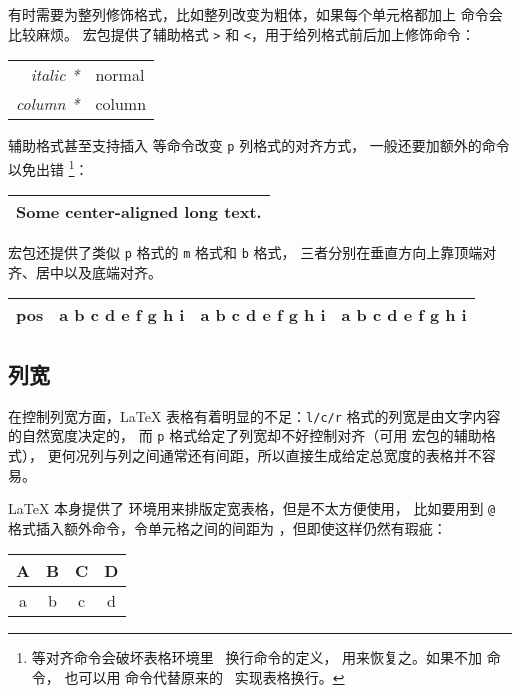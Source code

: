 有时需要为整列修饰格式，比如整列改变为粗体，如果每个单元格都加上  命令会比较麻烦。
 宏包提供了辅助格式 \texttt> 和 \texttt<，用于给列格式前后加上修饰命令：
\begin{example}
\begin{tabular}{>{\itshape}r<{*}l}
  \hline
  italic & normal \\
  column & column \\
  \hline
\end{tabular}
\end{example}

辅助格式甚至支持插入  等命令改变 \texttt{p} 列格式的对齐方式，
一般还要加额外的命令  以免出错%
\footnote{ 等对齐命令会破坏表格环境里 \crcmd\ 换行命令的定义，
 用来恢复之。如果不加  命令，
也可以用  命令代替原来的 \crcmd\ 实现表格换行。}：
\begin{example}
\begin{tabular}
{>{\centering\arraybackslash}p{9em}}
  \hline
  Some center-aligned long text. \\
  \hline
\end{tabular}
\end{example}

 宏包还提供了类似 \texttt{p} 格式的 \texttt{m} 格式和 \texttt{b} 格式，
三者分别在垂直方向上靠顶端对齐、居中以及底端对齐。
\begin{example}
\newcommand\txt
  {a b c d e f g h i}
\begin{tabular}{cp{2em}m{2em}b{2em}}
  \hline
  pos & \txt & \txt & \txt \\
  \hline
\end{tabular}
\end{example}

\subsection{列宽}\label{subsec:colwidth}

在控制列宽方面，\LaTeX{} 表格有着明显的不足：\texttt{l/c/r} 格式的列宽是由文字内容的自然宽度决定的，
而 \texttt{p} 格式给定了列宽却不好控制对齐（可用  宏包的辅助格式），
更何况列与列之间通常还有间距，所以直接生成给定总宽度的表格并不容易。

\LaTeX{} 本身提供了  环境用来排版定宽表格，但是不太方便使用，
比如要用到 \texttt{@} 格式插入额外命令，令单元格之间的间距为 ，但即使这样仍然有瑕疵：
\begin{example}
\begin{tabular*}{14em}%
{@{\extracolsep{\fill}}|c|c|c|c|}
  \hline
  A & B & C & D \\ \hline
  a & b & c & d \\ \hline
\end{tabular*}
\end{example}

